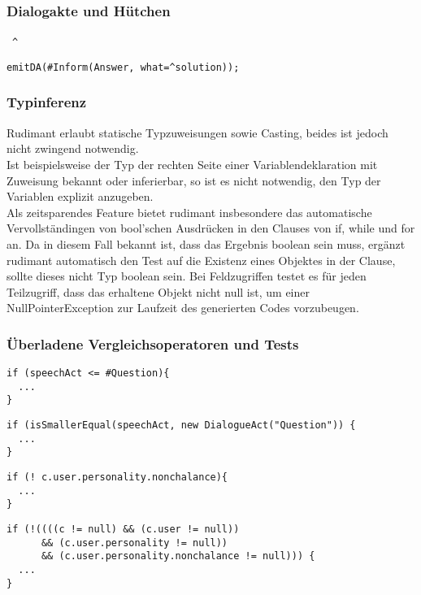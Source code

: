 \subsubsection{Dialogakte und Hütchen} \ {\Large\verb|^|}

\begin{verbatim}
emitDA(#Inform(Answer, what=^solution));
\end{verbatim}

\subsubsection{Typinferenz} \label{rudimant-Typinferenz}

Rudimant erlaubt statische Typzuweisungen sowie Casting, beides ist jedoch nicht zwingend notwendig.\\
Ist beispielsweise der Typ der rechten Seite einer Variablendeklaration mit Zuweisung bekannt oder inferierbar, so ist es nicht notwendig, den Typ der Variablen explizit anzugeben.\\
Als zeitsparendes Feature bietet rudimant insbesondere das automatische Vervollständingen von bool'schen Ausdrücken in den Clauses von if, while und for an. Da in diesem Fall bekannt ist, dass das Ergebnis boolean sein muss, ergänzt rudimant automatisch den Test auf die Existenz eines Objektes in der Clause, sollte dieses nicht Typ boolean sein. Bei Feldzugriffen testet es für jeden Teilzugriff, dass das erhaltene Objekt nicht null ist, um einer NullPointerException zur Laufzeit des generierten Codes vorzubeugen.

\subsubsection{Überladene Vergleichsoperatoren und Tests}

\begin{minipage}{0.4\textwidth}
\begin{verbatim}
if (speechAct <= #Question){
  ...
}
\end{verbatim}
\end{minipage}
\begin{minipage}{0.6\textwidth}
\begin{verbatim}
if (isSmallerEqual(speechAct, new DialogueAct("Question")) {
  ...
}
\end{verbatim}
\end{minipage}
\newline


\begin{minipage}{0.4\textwidth}
\begin{verbatim}
if (! c.user.personality.nonchalance){
  ...
}
\end{verbatim}
\end{minipage}
\begin{minipage}{0.6\textwidth}
\begin{verbatim}
if (!((((c != null) && (c.user != null))
      && (c.user.personality != null))
      && (c.user.personality.nonchalance != null))) {
  ...
}
\end{verbatim}
\end{minipage}

